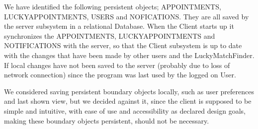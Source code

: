 We have identified the following persistent objects; APPOINTMENTS, LUCKYAPPOINTMENTS, USERS and NOFICATIONS. They are all saved by the server subsystem in a relational Database. When the Client starts up it synchronizes the APPOINTMENTS, LUCKYAPPOINTMENTS and NOTIFICATIONS with the server, so that the Client subsystem is up to date with the changes that have been made by other users and the LuckyMatchFinder. If local changes have not been saved to the server (probably due to loss of network connection) since the program was last used by the logged on User.

We considered saving persistent boundary objects locally, such as user preferences and last shown view, but we decided against it, since the client is supposed to be simple and intuitive, with ease of use and accessibility as declared design goals, making these boundary objects persistent, should not be necessary. 
